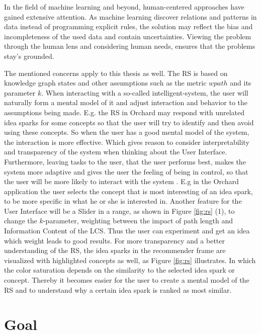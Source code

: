 \documentclass[pdftex,a4paper,12pt]{scrartcl}
\theoremstyle{definition}
\begin{document}
In the field of machine learning and beyond, human-centered approaches have gained extensive attention. As machine learning discover relations and patterns in data instead of programming explicit rules, the solution may reflect the bias and incompleteness of the used data and contain uncertainties. 
Viewing the problem through the human lens and considering human needs, ensures that the problems stay's grounded. 

The mentioned concerns apply to this thesis as well. The RS is based on knowledge graph states and other assumptions such as the metric $wpath$ and its parameter $k$. When interacting with a so-called intelligent-system, the user will naturally form a mental model of it and adjust interaction and behavior to the assumptions being made. E.g. the RS in Orchard may respond with unrelated idea sparks for some concepts so that the user will try to identify and then avoid using these concepts. So when the user has a good mental model of the system, the interaction is more effective. Which gives reason to consider interpretability and transparency of the system when thinking about the User Interface. Furthermore, leaving tasks to the user, that the user performs best, makes the system more adaptive and gives the user the feeling of being in control, so that the user will be more likely to interact with the system \citep{abdul_trends_2018}. E.g in the Orchard application the user selects the concept that is most interesting of an idea spark, to be more specific in what he or she is interested in. Another feature for the User Interface will be a Slider in a range, as shown in Figure \ref{fig:rs} (1), to change the $k$-parameter, weighting between the impact of path length and Information Content of the LCS. Thus the user can experiment and get an idea which weight leads to good results. For more transparency and a better understanding of the RS, the idea sparks in the recommender frame are visualized with highlighted concepts as well, as Figure \ref{fig:rs} illustrates. In which the color saturation depends on the similarity to the selected idea spark or concept. Thereby it becomes easier for the user to create a mental model of the RS and to understand why a certain idea spark is ranked as most similar.

\section{Goal} 
    
\end{document}
